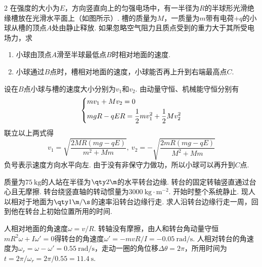 \begin{problem}
\begin{paracol}{2}
    在强度的大小为$E$，方向竖直向上的匀强电场中，有一半径为$R$的半球形光滑绝缘槽放在光滑水平面上（如图所示）. 槽的质量为$M$，一质量为$m$带有电荷$+q$的小球从槽的顶点$A$处由静止释放. 如果忽略空气阻力且质点受到的重力大于其所受电场力，求
\switchcolumn\centering
{}
\end{paracol}
\begin{enumerate}
    \item 小球由顶点$A$滑至半球最低点$B$时相对地面的速度.
    \item 小球通过$B$点时，槽相对地面的速度，小球能否再上升到右端最高点$C$.
\end{enumerate}
\end{problem}
\begin{solution}
    设在$B$点小球与槽的速度大小分别为$v_1$和$v_2$. 由动量守恒、机械能守恒分别有
    \[\begin{dcases}
        mv_1+Mv_2=0\\
        mgR-qER=\frac12mv_1^2+\frac12Mv_2^2
    \end{dcases}\]
    联立以上两式得
    \[v_1=\sqrt{\frac{2MR(mg-qE)}{m^2+Mm}},\ v_2=-\sqrt{\frac{2mR(mg-qE)}{M^2+Mm}}\]
    负号表示速度方向水平向左. 由于没有非保守力做功，所以小球可以再升到$C$点.
\end{solution}

\begin{problem}
    质量为$\qty{75}\kg$的人站在半径为$\qty2\m$的水平转台边缘. 转台的固定转轴竖直通过台心且无摩擦. 转台绕竖直轴的转动惯量为$\qty{3000}{\kg\cdot\m^{-2}}$. 开始时整个系统静止. 现人以相对于地面为$\qty1{\m/\s}$的速率沿转台边缘行走. 求人沿转台边缘行走一周，回到他在转台上初始位置所用的时间.
\end{problem}
\begin{solution}
    人相对地面的角速度$\omega=v/R$. 转轴没有摩擦，由人和转台角动量守恒$mR^2\omega+I\omega'=0$得转台的角速度$\omega'=-mvR/I=\qty{-0.05}{\radian/\s}$. 人相对转台的角速度为$\omega_r=\omega-\omega'=\qty{0.55}{\radian/\s}$，走动一圈的角位移$\Delta\theta=2\pi$，所用时间为$t=2\pi/\omega_r=2\pi/{0.55}=\qty{11.4}\s$.
\end{solution}

